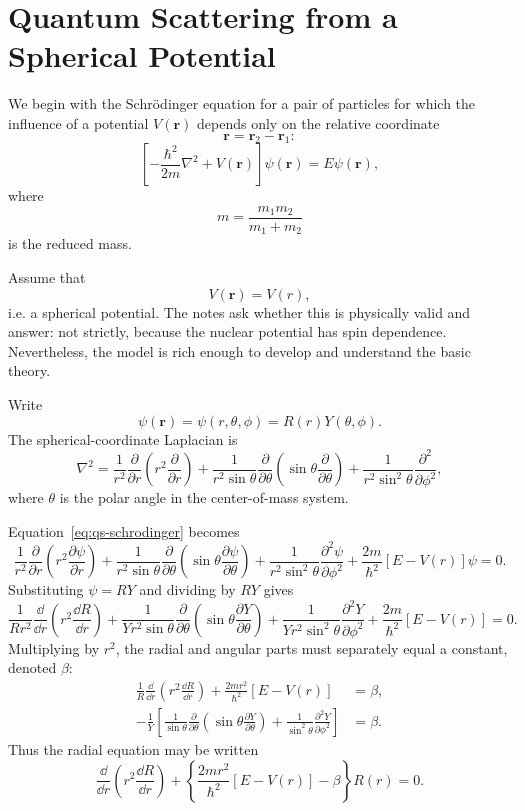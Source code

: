 \chapter{Quantum Scattering from a Spherical Potential}

We begin with the Schr\"odinger equation for a pair of particles for which the influence of a potential $V(\bm r)$ depends only on the relative coordinate
\[
  \bm r=\bm r_2-\bm r_1:
\]
\begin{equation}
  \left[-\frac{\hbar^2}{2m}\nabla^2+V(\bm r)\right]\psi(\bm r)=E\psi(\bm r),
  \label{eq:qs-schrodinger}
\end{equation}
where
\[
  m=\frac{m_1m_2}{m_1+m_2}
\]
is the reduced mass.

Assume that
\[
  V(\bm r)=V(r),
\]
i.e. a spherical potential.  The notes ask whether this is physically valid and answer: not strictly, because the nuclear potential has spin dependence.  Nevertheless, the model is rich enough to develop and understand the basic theory.

Write
\[
  \psi(\bm r)=\psi(r,\theta,\phi)=R(r)Y(\theta,\phi).
\]
The spherical-coordinate Laplacian is
\[
  \nabla^2=
  \frac{1}{r^2}\frac{\partial}{\partial r}
  \left(r^2\frac{\partial}{\partial r}\right)
  +\frac{1}{r^2\sin\theta}\frac{\partial}{\partial\theta}
  \left(\sin\theta\frac{\partial}{\partial\theta}\right)
  +\frac{1}{r^2\sin^2\theta}\frac{\partial^2}{\partial\phi^2},
\]
where $\theta$ is the polar angle in the center-of-mass system.

Equation~\eqref{eq:qs-schrodinger} becomes
\[
  \frac{1}{r^2}\frac{\partial}{\partial r}
  \left(r^2\frac{\partial\psi}{\partial r}\right)
  +\frac{1}{r^2\sin\theta}\frac{\partial}{\partial\theta}
  \left(\sin\theta\frac{\partial\psi}{\partial\theta}\right)
  +\frac{1}{r^2\sin^2\theta}\frac{\partial^2\psi}{\partial\phi^2}
  +\frac{2m}{\hbar^2}[E-V(r)]\psi=0.
\]
Substituting $\psi=RY$ and dividing by $RY$ gives
\[
  \frac{1}{Rr^2}\frac{\dd}{\dd r}
  \left(r^2\frac{\dd R}{\dd r}\right)
  +\frac{1}{Yr^2\sin\theta}\frac{\partial}{\partial\theta}
  \left(\sin\theta\frac{\partial Y}{\partial\theta}\right)
  +\frac{1}{Yr^2\sin^2\theta}\frac{\partial^2Y}{\partial\phi^2}
  +\frac{2m}{\hbar^2}[E-V(r)]=0.
\]
Multiplying by $r^2$, the radial and angular parts must separately equal a constant, denoted $\beta$:
\begin{align*}
  \frac{1}{R}\frac{\dd}{\dd r}\left(r^2\frac{\dd R}{\dd r}\right)
  +\frac{2mr^2}{\hbar^2}[E-V(r)]
  &=\beta,\\
  -\frac{1}{Y}\left[
  \frac{1}{\sin\theta}\frac{\partial}{\partial\theta}
  \left(\sin\theta\frac{\partial Y}{\partial\theta}\right)
  +\frac{1}{\sin^2\theta}\frac{\partial^2Y}{\partial\phi^2}
  \right]
  &=\beta.
\end{align*}
Thus the radial equation may be written
\begin{equation}
  \frac{\dd}{\dd r}\left(r^2\frac{\dd R}{\dd r}\right)
  +\left\{\frac{2mr^2}{\hbar^2}[E-V(r)]-\beta\right\}R(r)=0.
  \label{eq:qs-radial-beta}
\end{equation}

